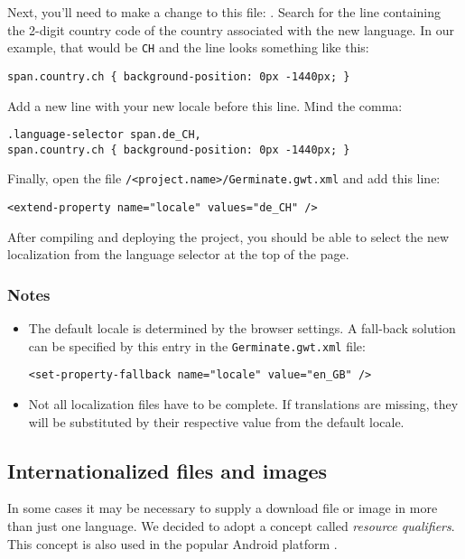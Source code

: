 Next, you'll need to make a change to this file: . Search for the line containing the 2-digit country code of the country associated with the new language. In our example, that would be \texttt{CH} and the line looks something like this:

\begin{lstlisting}[style=CSS]
span.country.ch { background-position: 0px -1440px; }
\end{lstlisting}
\noindent
Add a new line with your new locale before this line. Mind the comma:

\begin{lstlisting}[style=CSS]
.language-selector span.de_CH,
span.country.ch { background-position: 0px -1440px; }
\end{lstlisting}
\noindent
Finally, open the file \instanceStuff\texttt{/<project.name>/Germinate.gwt.xml} and add this line:

\begin{lstlisting}[style=Xml]
<extend-property name="locale" values="de_CH" />
\end{lstlisting}
\noindent
After compiling and deploying the project, you should be able to select the new localization from the language selector at the top of the page.

\subsubsection{Notes}
\begin{itemize}
    \item The default locale is determined by the browser settings. A fall-back solution can be specified by this entry in the \texttt{Germinate.gwt.xml} file:
            \begin{lstlisting}[style=Xml]
<set-property-fallback name="locale" value="en_GB" />
            \end{lstlisting}
    \item Not all localization files have to be complete. If translations are missing, they will be substituted by their respective value from the default locale.
\end{itemize}

\subsection{Internationalized files and images}
\label{sec:localized-files}
In some cases it may be necessary to supply a download file or image in more than just one language. We decided to adopt a concept called \textit{resource qualifiers}. This concept is also used in the popular Android platform \cite{ResourceQualifiers}.


